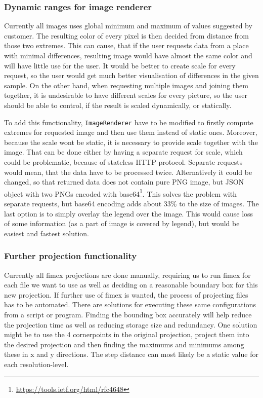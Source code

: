 \documentclass[11pt,a4paper,titlepage,oneside]{report}
\begin{document}
\subsubsection{Dynamic ranges for image renderer}
Currently all images uses global minimum and maximum of values suggested by customer. The resulting color of every pixel is then decided from distance from those two extremes. This can cause, that if the user requests data from a place with minimal differences, resulting image would have almost the same color and will have little use for the user. It would be better to create scale for every request, so the user would get much better visualisation of differences in the given sample. On the other hand, when requesting multiple images and joining them together, it is undesirable to have different scales for every picture, so the user should be able to control, if the result is scaled dynamically, or statically.

To add this functionality, \texttt{ImageRenderer} have to be modified to firstly compute extremes for requested image and then use them instead of static ones. Moreover, because the scale wont be static, it is necessary to provide scale together with the image. That can be done either by having a separate request for scale, which could be problematic, because of stateless HTTP protocol. Separate requests would mean, that the data have to be processed twice. Alternatively it could be changed, so that returned data does not contain pure \gls{PNG} image, but JSON object with two \gls{PNG}s encoded with base64\footnote{\url{https://tools.ietf.org/html/rfc4648}}. This solves the problem with separate requests, but base64 encoding adds about 33\% to the size of images. The last option is to simply overlay the legend over the image. This would cause loss of some information (as a part of image is covered by legend), but would be easiest and fastest solution.

\subsubsection{Further projection functionality}

Currently all fimex projections are done manually, requiring us to run fimex for each file we want to use as well as deciding on a reasonable boundary box for this new projection. If further use of fimex is wanted, the process of projecting files has to be automated. There are solutions for executing these same configurations from a script or program. Finding the bounding box accurately will help reduce the projection time as well as reducing storage size and redundancy. One solution might be to use the 4 cornerpoints in the original projection, project them into the desired projection and then finding the maximums and minimums among these in x and y directions. The step distance can most likely be a static value for each resolution-level.
\end{document}
